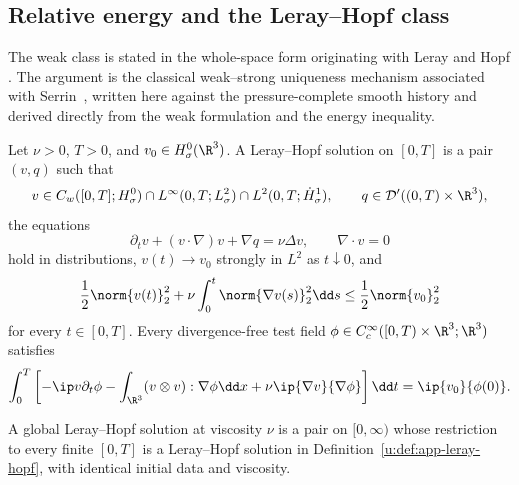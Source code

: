 \subsection{Relative energy and the Leray--Hopf class}

The weak class is stated in the whole-space form originating with Leray and
Hopf \cite{Leray1934,Hopf1951}.  The argument is the classical weak--strong
uniqueness mechanism associated with Serrin~\cite{Serrin1962}, written here
against the pressure-complete smooth history and derived directly from the
weak formulation and the energy inequality.

\begin{definition}
\label{u:def:app-leray-hopf}
Let \(\nu>0\), \(T>0\), and \(v_0\in H^0_\sigma(\R^3)\).  A Leray--Hopf solution on
\([0,T]\) is a pair \((v,q)\) such that
\[
 v\in C_w([0,T];H^0_\sigma)
 \cap L^\infty(0,T;L^2_\sigma)
 \cap L^2(0,T;\dot H^1_\sigma),
 \qquad
 q\in\mathcal D'((0,T)\times\R^3),
\]
the equations
\[
 \partial_tv+(v\cdot\nabla)v+\nabla q=\nu\Delta v,
 \qquad
 \nabla\cdot v=0
\]
hold in distributions, \(v(t)\to v_0\) strongly in \(L^2\) as
\(t\downarrow0\), and
\begin{equation}
 \frac12\norm{v(t)}_2^2
 +\nu\int_0^t\norm{\nabla v(s)}_2^2\dd s
 \le\frac12\norm{v_0}_2^2
 \label{u:eq:app-leray-energy}
\end{equation}
for every \(t\in[0,T]\).  Every divergence-free test field
\(\phi\in C_c^\infty([0,T)\times\R^3;\R^3)\) satisfies
\begin{equation}
 \int_0^T\left[
 -\ip v{\partial_t\phi}
 -\int_{\R^3}(v\otimes v):\nabla\phi\dd x
 +\nu\ip{\nabla v}{\nabla\phi}
 \right]\dd t
 =\ip{v_0}{\phi(0)}.
 \label{u:eq:app-leray-weak-form}
\end{equation}
\end{definition}

A global Leray--Hopf solution at viscosity \(\nu\) is a pair on
\([0,\infty)\) whose restriction to every finite \([0,T]\) is a
Leray--Hopf solution in Definition~\ref{u:def:app-leray-hopf}, with identical initial data and viscosity.


